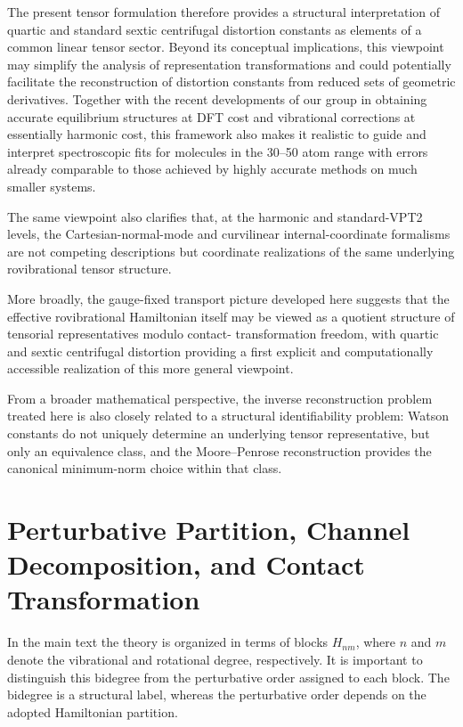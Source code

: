 \documentclass[journal=jacsat,manuscript=article]{achemso}
\begin{document}
The present tensor formulation therefore provides a structural
interpretation of quartic and standard sextic centrifugal distortion
constants as elements of a common linear tensor sector. Beyond its
conceptual implications, this viewpoint may simplify the analysis of
representation transformations and could potentially facilitate the
reconstruction of distortion constants from reduced sets of geometric
derivatives. Together with the recent developments of our group in
obtaining accurate equilibrium structures at DFT cost and vibrational
corrections at essentially harmonic cost, this framework also makes it
realistic to guide and interpret spectroscopic fits for molecules in the
30--50 atom range with errors already comparable to those achieved by
highly accurate methods on much smaller systems.

The same viewpoint also clarifies that, at the harmonic and
standard-VPT2 levels, the Cartesian-normal-mode and curvilinear
internal-coordinate formalisms are not competing descriptions but
coordinate realizations of the same underlying rovibrational tensor
structure.

More broadly, the gauge-fixed transport picture developed here suggests
that the effective rovibrational Hamiltonian itself may be viewed as a
quotient structure of tensorial representatives modulo contact-
transformation freedom, with quartic and sextic centrifugal distortion
providing a first explicit and computationally accessible realization
of this more general viewpoint.

From a broader mathematical perspective, the inverse reconstruction
problem treated here is also closely related to a structural
identifiability problem: Watson constants do not uniquely determine an
underlying tensor representative, but only an equivalence class, and
the Moore--Penrose reconstruction provides the canonical minimum-norm
choice within that class.


\appendix

\section{Perturbative Partition, Channel Decomposition, and Contact Transformation}

In the main text the theory is organized in terms of blocks $H_{nm}$, where
$n$ and $m$ denote the vibrational and rotational degree, respectively. It is
important to distinguish this bidegree from the perturbative order assigned to
each block. The bidegree is a structural label, whereas the perturbative order
depends on the adopted Hamiltonian partition.
\end{document}
